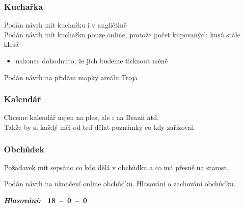 \documentclass[10pt,a4paper]{report}
\newcommand{\hlas}[3]{
  \begin{flushright}
  {\it\bfseries Hlasování:\/}\ \ {\bfseries #1\ --\ #2\ --\ #3}
  \end{flushright}
}
\begin{document}
\subsubsection{Kuchařka}
Podán návrh mít kuchařku i v angličtině\\
Podán návrh mít kuchařku pouze online, protože počet kupovaných kusů stále klesá
\begin{itemize}
  \item nakonec dohodnuto, že jich budeme tisknout méně 
\end{itemize}
Podán návrh na přidáni mapky areálu Troja\\

\subsubsection{Kalendář}
Chceme kalendář nejen na ples, ale i na Beanii atd.\\
Takže by si každý měl od teď dělat poznámky co kdy zařizoval.

\subsubsection{Obchůdek}
Požadavek mít sepsáno co kdo dělá v obchůdku a co má přesně na starost.

Podán návrh na ukončení online obchůdku. Hlasování o zachování obchůdku.
\hlas{18}{0}{0}
\end{document}
